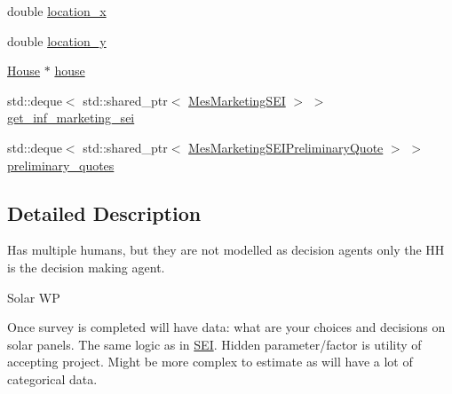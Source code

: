 {\bf }\par
\begin{DoxyCompactItemize}
\item 
double \hyperlink{classsolar__core_1_1_household_a6596375631a366fdd24270f75548841f}{location\+\_\+x}
\item 
double \hyperlink{classsolar__core_1_1_household_a1ba6b7af82982096e05d99a70a2647eb}{location\+\_\+y}
\end{DoxyCompactItemize}

{\bf }\par
\begin{DoxyCompactItemize}
\item 
\hyperlink{classsolar__core_1_1_house}{House} $\ast$ \hyperlink{classsolar__core_1_1_household_a1104d8264fe733937e1fd2e9ad0f8fc1}{house}
\end{DoxyCompactItemize}

{\bf }\par
\begin{DoxyCompactItemize}
\item 
std\+::deque$<$ std\+::shared\+\_\+ptr$<$ \hyperlink{classsolar__core_1_1_mes_marketing_s_e_i}{Mes\+Marketing\+S\+E\+I} $>$ $>$ \hyperlink{classsolar__core_1_1_household_a3ae4cec5fca43ee5ca3287a01f5a05a2}{get\+\_\+inf\+\_\+marketing\+\_\+sei}
\item 
std\+::deque$<$ std\+::shared\+\_\+ptr$<$ \hyperlink{classsolar__core_1_1_mes_marketing_s_e_i_preliminary_quote}{Mes\+Marketing\+S\+E\+I\+Preliminary\+Quote} $>$ $>$ \hyperlink{classsolar__core_1_1_household_a297842358a2d79db160566106972bc0d}{preliminary\+\_\+quotes}
\end{DoxyCompactItemize}



\subsection{Detailed Description}
Has multiple humans, but they are not modelled as decision agents only the H\+H is the decision making agent.

\begin{DoxyRefDesc}{Solar W\+P}
\item[\hyperlink{wp__wp000001}{Solar W\+P}]Once survey is completed will have data\+: what are your choices and decisions on solar panels. The same logic as in \hyperlink{classsolar__core_1_1_s_e_i}{S\+E\+I}. Hidden parameter/factor is utility of accepting project. Might be more complex to estimate as will have a lot of categorical data.\end{DoxyRefDesc}


